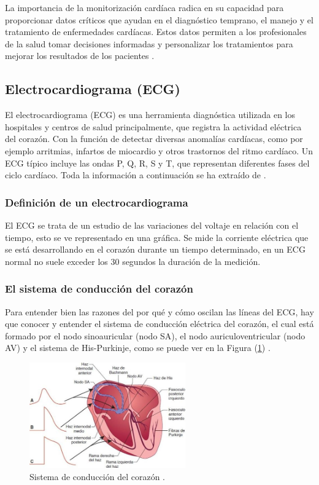 La importancia de la monitorización cardíaca radica en su capacidad para proporcionar datos críticos que ayudan en el diagnóstico temprano, el manejo y el tratamiento de enfermedades cardíacas. Estos datos permiten a los profesionales de la salud tomar decisiones informadas y personalizar los tratamientos para mejorar los resultados de los pacientes \cite{MayoClinic_monitoring}.

\subsection{Electrocardiograma (ECG)}

El electrocardiograma (ECG) es una herramienta diagnóstica utilizada en los hospitales y centros de salud principalmente, que registra la actividad eléctrica del corazón. Con la función de detectar diversas anomalías cardíacas, como por ejemplo arritmias, infartos de miocardio y otros trastornos del ritmo cardíaco. Un ECG típico incluye las ondas P, Q, R, S y T, que representan diferentes fases del ciclo cardíaco. Toda la información a continuación se ha extraído de \cite{azcona2009electrocardiograma}.

\subsubsection{Definición de un electrocardiograma}

El ECG se trata de un estudio de las variaciones del voltaje en relación con el tiempo, esto se ve representado en una gráfica. Se mide la corriente eléctrica que se está desarrollando en el corazón durante un tiempo determinado, en un ECG normal no suele exceder los 30 segundos la duración de la medición.

\subsubsection{El sistema de conducción del corazón}

Para entender bien las razones del por qué y cómo oscilan las líneas del ECG, hay que conocer y entender el sistema de conducción eléctrica del corazón, el cual está formado por el nodo sinoauricular (nodo SA), el nodo auriculoventricular (nodo AV) y el sistema de His-Purkinje, como se puede ver en la Figura (\ref{fig:conduccion_cardiaca}) \cite{enfermeriatop2024}.

\begin{figure}[h]
    \centering
    \includegraphics[width=0.6\textwidth]{img/conduccion_cardiaca.png}
    \caption{Sistema de conducción del corazón \cite{enfermeriatop2024}.}
    \label{fig:conduccion_cardiaca}
\end{figure}

